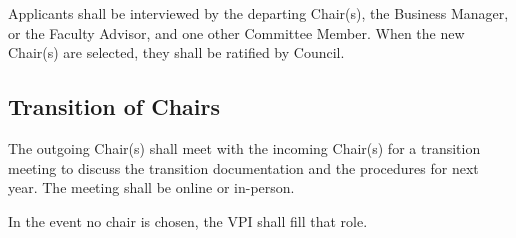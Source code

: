 Applicants shall be interviewed by the departing Chair(s), the Business Manager, 
or the Faculty Advisor, and one other Committee Member.
When the new Chair(s) are selected, they shall be ratified by Council.

\subsection{Transition of Chairs}
The outgoing Chair(s) shall meet with the incoming Chair(s) for a transition 
meeting to discuss the transition documentation and the procedures for next year. The 
meeting shall be online or in-person.

In the event no chair is chosen, the VPI shall fill that role.

